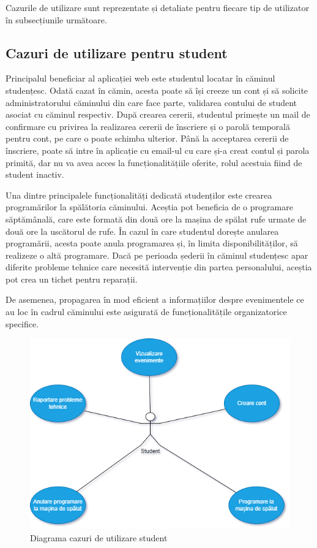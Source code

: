 \documentclass[12pt,a4paper]{report}
\theoremstyle{definition}
\theoremstyle{remark}
\begin{document}
\par Cazurile de utilizare sunt reprezentate și detaliate pentru fiecare tip de utilizator în subsecțiunile următoare.

\subsection{Cazuri de utilizare pentru student}
\par Principalul beneficiar al aplicației web este studentul locatar în căminul studențesc. Odată cazat în cămin, acesta poate să își creeze un cont și să solicite administratorului căminului din care face parte, validarea contului de student asociat cu căminul respectiv. După crearea cererii, studentul primește un mail de confirmare cu privirea la realizarea cererii de înscriere și o parolă temporală pentru cont, pe care o poate schimba ulterior. Până la acceptarea cererii de înscriere, poate să intre în aplicație cu email-ul cu care și-a creat contul și parola primită, dar nu va avea acces la funcționalitățiile oferite, rolul acestuia fiind de student inactiv.

\par Una dintre principalele funcționalități dedicată studenților este crearea \textnormal{pro\-gra\-mă\-ri\-lor} la spălătoria căminului. Aceștia pot beneficia de o programare săptămânală, care este formată din două ore la mașina de spălat rufe urmate de două ore la uscătorul de rufe. În cazul în care studentul dorește anularea programării, acesta poate anula programarea și, în limita disponibilităților, să realizeze o altă programare. Dacă pe perioada șederii în căminul studențesc apar diferite probleme tehnice care necesită intervenție din partea personalului, aceștia pot crea un tichet pentru reparații.

\par De asemenea, propagarea în mod eficient a informațiilor despre evenimentele ce au loc în cadrul căminului este asigurată de funcționalitățile organizatorice specifice.

\begin{figure}[H]
    \centering
    \includegraphics[width=0.75\linewidth]{resurse/diagrame/use_case_student.drawio.png}
    \caption{Diagrama cazuri de utilizare student}
\end{figure}
\end{document}
